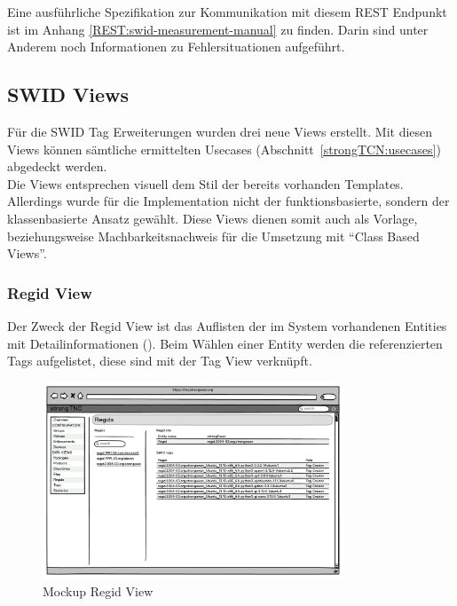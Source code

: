 
Eine ausführliche Spezifikation zur Kommunikation mit diesem REST Endpunkt ist
im Anhang \autoref{REST:swid-measurement-manual} zu finden. Darin sind unter
Anderem noch Informationen zu Fehlersituationen aufgeführt.


\subsection{SWID Views}
Für die SWID Tag Erweiterungen wurden drei neue Views erstellt. Mit diesen
Views können sämtliche ermittelten Usecases (Abschnitt~\ref{strongTCN:usecases})
abgedeckt werden.\\
Die Views entsprechen visuell dem Stil der bereits vorhanden Templates.
Allerdings wurde für die Implementation nicht der funktionsbasierte,
sondern der klassenbasierte Ansatz gewählt. Diese Views dienen somit auch als
Vorlage, beziehungsweise Machbarkeitsnachweis für die Umsetzung mit
\enquote{Class Based Views}.


\subsubsection{Regid View}
Der Zweck der Regid View ist das Auflisten der im System vorhandenen Entities
mit Detailinformationen (). Beim Wählen einer Entity
werden die referenzierten Tags aufgelistet, diese sind mit der Tag View
verknüpft.

\begin{figure}[H]
	\centering
	\includegraphics[width=0.8\textwidth]{./images/mockups/swid-regid-view}
	\caption{Mockup Regid View}
	\label{fig:regid-view-mockup}
\end{figure}


